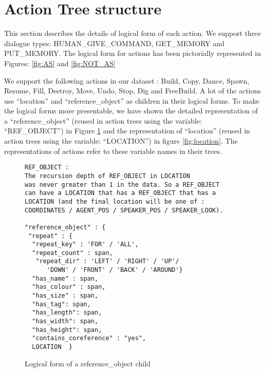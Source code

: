 \clearpage

\section{Action Tree structure}
\label{sec:action_tree}

This section describes the details of logical form of each action.
We support three dialogue types: HUMAN\_GIVE\_COMMAND, GET\_MEMORY and PUT\_MEMORY.
The logical form for actions has been pictorially represented in Figures: \ref{fig:AS} and \ref{fig:NOT_AS}

We support the following actions in our dataset : Build, Copy, Dance, Spawn, Resume, Fill, Destroy, Move, Undo, Stop, Dig and FreeBuild.
A lot of the actions use  ``location'' and ``reference\_object'' as children in their logical forms. To make the logical forms more presentable, we have shown the detailed representation of a ``reference\_object'' (reused in action trees using the variable: ``REF\_OBJECT'') in Figure \ref{fig:ref_obj} and the representation of ``location'' (reused in action trees using the variable: ``LOCATION'') in figure \ref{fig:location}. The representations of actions refer to these variable names in their trees.


\begin{figure}[ht]
    \centering
    \fontsize{7pt}{8pt}\selectfont
    \begin{verbatim}
REF_OBJECT :
The recursion depth of REF_OBJECT in LOCATION 
was never greater than 1 in the data. So a REF_OBJECT
can have a LOCATION that has a REF_OBJECT that has a 
LOCATION (and the final location will be one of : 
COORDINATES / AGENT_POS / SPEAKER_POS / SPEAKER_LOOK).

"reference_object" : {
 "repeat" : {
  "repeat_key" : 'FOR' / 'ALL',
  "repeat_count" : span,
   "repeat_dir" : 'LEFT' / 'RIGHT' / 'UP'/ 
      'DOWN' / 'FRONT' / 'BACK' / 'AROUND'}
  "has_name" : span,
  "has_colour" : span,
  "has_size" : span,
  "has_tag": span,
  "has_length": span,
  "has_width": span,
  "has_height": span,
  "contains_coreference" : "yes",
  LOCATION  }
    \end{verbatim}
    \vspace{-20pt}
    \caption{Logical form of a reference\_object child}
    \vspace{-8pt}
    \label{fig:ref_obj}
\end{figure}


